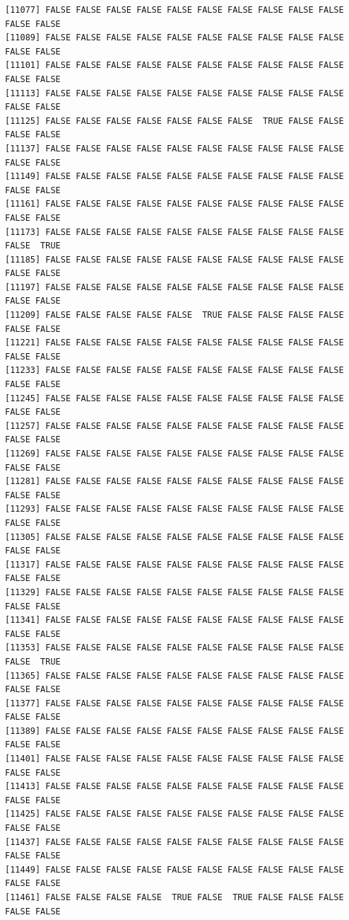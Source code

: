 \documentclass[
  a4paper,
  DIV=11,
  numbers=noendperiod]{scrartcl}
\begin{document}
\begin{verbatim}
[11077] FALSE FALSE FALSE FALSE FALSE FALSE FALSE FALSE FALSE FALSE FALSE FALSE
[11089] FALSE FALSE FALSE FALSE FALSE FALSE FALSE FALSE FALSE FALSE FALSE FALSE
[11101] FALSE FALSE FALSE FALSE FALSE FALSE FALSE FALSE FALSE FALSE FALSE FALSE
[11113] FALSE FALSE FALSE FALSE FALSE FALSE FALSE FALSE FALSE FALSE FALSE FALSE
[11125] FALSE FALSE FALSE FALSE FALSE FALSE FALSE  TRUE FALSE FALSE FALSE FALSE
[11137] FALSE FALSE FALSE FALSE FALSE FALSE FALSE FALSE FALSE FALSE FALSE FALSE
[11149] FALSE FALSE FALSE FALSE FALSE FALSE FALSE FALSE FALSE FALSE FALSE FALSE
[11161] FALSE FALSE FALSE FALSE FALSE FALSE FALSE FALSE FALSE FALSE FALSE FALSE
[11173] FALSE FALSE FALSE FALSE FALSE FALSE FALSE FALSE FALSE FALSE FALSE  TRUE
[11185] FALSE FALSE FALSE FALSE FALSE FALSE FALSE FALSE FALSE FALSE FALSE FALSE
[11197] FALSE FALSE FALSE FALSE FALSE FALSE FALSE FALSE FALSE FALSE FALSE FALSE
[11209] FALSE FALSE FALSE FALSE FALSE  TRUE FALSE FALSE FALSE FALSE FALSE FALSE
[11221] FALSE FALSE FALSE FALSE FALSE FALSE FALSE FALSE FALSE FALSE FALSE FALSE
[11233] FALSE FALSE FALSE FALSE FALSE FALSE FALSE FALSE FALSE FALSE FALSE FALSE
[11245] FALSE FALSE FALSE FALSE FALSE FALSE FALSE FALSE FALSE FALSE FALSE FALSE
[11257] FALSE FALSE FALSE FALSE FALSE FALSE FALSE FALSE FALSE FALSE FALSE FALSE
[11269] FALSE FALSE FALSE FALSE FALSE FALSE FALSE FALSE FALSE FALSE FALSE FALSE
[11281] FALSE FALSE FALSE FALSE FALSE FALSE FALSE FALSE FALSE FALSE FALSE FALSE
[11293] FALSE FALSE FALSE FALSE FALSE FALSE FALSE FALSE FALSE FALSE FALSE FALSE
[11305] FALSE FALSE FALSE FALSE FALSE FALSE FALSE FALSE FALSE FALSE FALSE FALSE
[11317] FALSE FALSE FALSE FALSE FALSE FALSE FALSE FALSE FALSE FALSE FALSE FALSE
[11329] FALSE FALSE FALSE FALSE FALSE FALSE FALSE FALSE FALSE FALSE FALSE FALSE
[11341] FALSE FALSE FALSE FALSE FALSE FALSE FALSE FALSE FALSE FALSE FALSE FALSE
[11353] FALSE FALSE FALSE FALSE FALSE FALSE FALSE FALSE FALSE FALSE FALSE  TRUE
[11365] FALSE FALSE FALSE FALSE FALSE FALSE FALSE FALSE FALSE FALSE FALSE FALSE
[11377] FALSE FALSE FALSE FALSE FALSE FALSE FALSE FALSE FALSE FALSE FALSE FALSE
[11389] FALSE FALSE FALSE FALSE FALSE FALSE FALSE FALSE FALSE FALSE FALSE FALSE
[11401] FALSE FALSE FALSE FALSE FALSE FALSE FALSE FALSE FALSE FALSE FALSE FALSE
[11413] FALSE FALSE FALSE FALSE FALSE FALSE FALSE FALSE FALSE FALSE FALSE FALSE
[11425] FALSE FALSE FALSE FALSE FALSE FALSE FALSE FALSE FALSE FALSE FALSE FALSE
[11437] FALSE FALSE FALSE FALSE FALSE FALSE FALSE FALSE FALSE FALSE FALSE FALSE
[11449] FALSE FALSE FALSE FALSE FALSE FALSE FALSE FALSE FALSE FALSE FALSE FALSE
[11461] FALSE FALSE FALSE FALSE  TRUE FALSE  TRUE FALSE FALSE FALSE FALSE FALSE

\end{verbatim}
\end{document}
